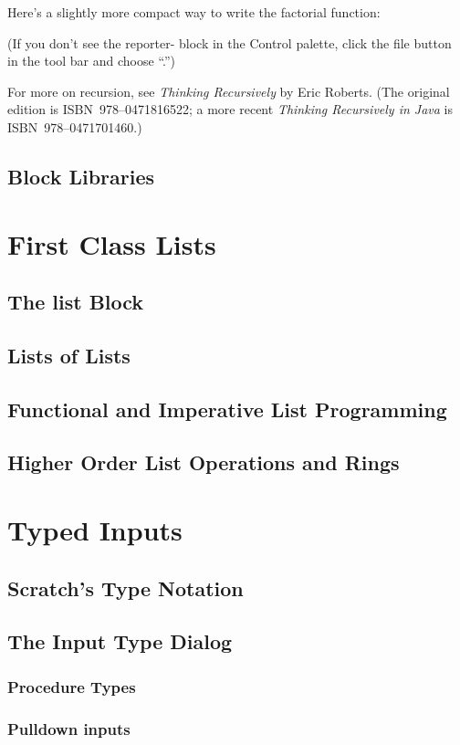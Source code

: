 \documentclass{report}
\begin{document}
Here's a slightly more compact way to write the factorial function:\nopagebreak


(If you don't see the reporter- block in the Control palette, click the file button~ in the tool bar and choose ``.'')

For more on recursion, see \textit{Thinking Recursively} by Eric Roberts. (The original edition is ISBN~978--0471816522; a more recent \textit{Thinking Recursively in Java} is ISBN~978--0471701460.)

\section{Block Libraries}
\chapter{First Class Lists}
\section{The list Block}
\section{Lists of Lists}
\section{Functional and Imperative List Programming}
\section{Higher Order List Operations and Rings}
\chapter{Typed Inputs}
\section{Scratch's Type Notation}
\section{The \Snap{} Input Type Dialog}
\subsection{Procedure Types}
\subsection{Pulldown inputs}
\end{document}
